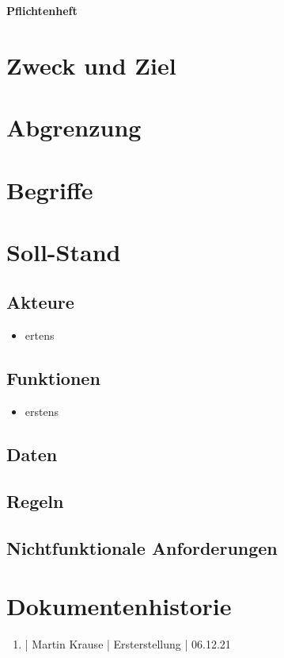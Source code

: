\documentclass[11pt]{scrartcl}
\begin{document}
\begin{center}
\textbf{Pflichtenheft}
\end{center}

\section{Zweck und Ziel}


\section{Abgrenzung}


\section{Begriffe}


\section{Soll-Stand}


\subsection{Akteure}

\begin{itemize}
	\item ertens
\end{itemize}

\subsection{Funktionen}

\begin{itemize}
	\item erstens
\end{itemize}

\subsection{Daten}



\subsection{Regeln}


\subsection{Nichtfunktionale Anforderungen}


\section{Dokumentenhistorie}

\begin{enumerate}
	\item | Martin Krause | Ersterstellung | 06.12.21
\end{enumerate}
 
\end{document}
